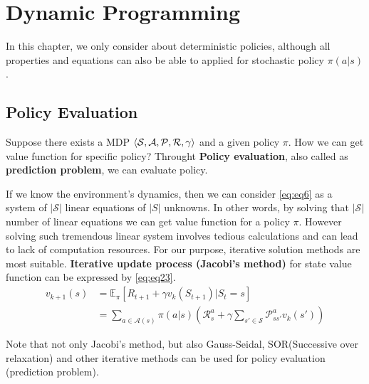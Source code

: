 \documentclass[
	10pt, %
]{article}
\theoremstyle{plain}
\newcommand{\mbb}[1]{\mathbb{#1}}
\newcommand{\mc}[1]{\mathcal{#1}}
\newcommand{\tb}[1]{\textbf{#1}}
\numberwithin{equation}{subsection} %
\begin{document}
\section{Dynamic Programming}
In this chapter, we only consider about deterministic policies, although all properties and equations can also be able to applied for stochastic policy $\pi(a|s)$.
\subsection{Policy Evaluation}
Suppose there exists a MDP $\braket{\mc{S,A,P,R}, \gamma}$ and a given policy $\pi$. How we can get value function for specific policy? Throught \tb{Policy evaluation}, also called as \tb{prediction problem}, we can evaluate policy.

If we know the environment's dynamics, then we can consider \cref{eq:eq6} as a system of $|\mc{S}|$ linear equations of $|S|$ unknowns. In other words, by solving that $|\mc{S}|$ number of linear equations we can get value function for a policy $\pi$. However solving such tremendous linear system involves tedious calculations and can lead to lack of computation resources. For our purpose, iterative solution methods are most suitable. \tb{Iterative update process (Jacobi's method)} for state value function can be expressed by \cref{eq:eq23}.
\begin{equation} \label{eq:eq23}
    \begin{aligned}
        v_{k+1}(s) &= \mbb{E}_\pi [R_{t+1} + \gamma v_k(S_{t+1}) | S_t = s] \\
        &= \sum_{a \in \mc{A}(s)} \pi(a|s)\left(\mc{R}^a_s + \gamma\sum_{s' \in \mc{S}}\mc{P}^a_{ss'}v_{k}(s') \right)
    \end{aligned}
\end{equation}

Note that not only Jacobi's method, but also Gauss-Seidal, SOR(Successive over relaxation) and other iterative methods can be used for policy evaluation (prediction problem).
\end{document}
